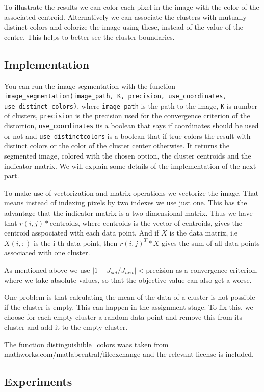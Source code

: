 To illustrate the results we can color each pixel in the image with the color of the associated centroid. Alternatively we can associate the clusters with mutually distinct colors and colorize the image using these, instead of the value of the centre. This helps to better see the cluster boundaries.

\subsection{Implementation}

You can run the image segmentation with the function \texttt{image\_segmentation(image\_path, K, precision, use\_coordinates, use\_distinct\_colors)}, where \texttt{image\_path} is the path to the image, \texttt{K} is number of clusters, \texttt{precision} is the precision used for the convergence criterion of the distortion, \texttt{use\_coordinates} iis a boolean that says if coordinates should be used or not and \texttt{use\_distinctcolors} is a boolean that if true colors the result with distinct colors or the color of the cluster center otherwise. It returns the segmented image, colored with the chosen option, the cluster centroids and the indicator matrix.
 We will explain some details of the implementation of the next part.

To make use of vectorization and matrix operations we vectorize the image. That means instead of indexing pixels by two indexes we use just one. This has the advantage that the indicator matrix is a two dimensional matrix. Thus we have that $r(i,j)*\text{centroids}$, where centroids is the vector of centroids, gives the centroid asspociated with each data point. And if $X$ is the data matrix, i.e $X(i,:)$ is the i-th data point, then $r(i,j)^T * X$ gives the sum of all data points associated with one cluster.

As mentioned above we use $\vert 1-J_{old}/J_{new}\vert < \text{precision}$ as a convergence criterion, where we take absolute values, so that the objective value can also get a worse.

One problem is that calculating the mean of the data of a cluster is not possible if the cluster is empty. This can happen in the assignment stage. To fix this, we choose for each empty cluster a random data point and remove this from its cluster and add it to the empty cluster.

The function distinguishible\_colors waas taken from mathworks.com/matlabcentral/fileexchange and the relevant license is included.
\subsection{Experiments}

